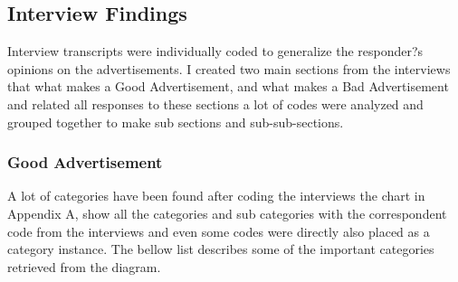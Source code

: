 \subsection{Interview Findings}
Interview transcripts were individually coded to generalize the responder?s opinions on the advertisements. I created two main sections from the interviews that what makes a Good Advertisement, and what makes a Bad Advertisement and related all responses to these sections a lot of codes were analyzed and grouped together to make sub sections and sub-sub-sections.

\subsubsection{Good Advertisement}
A lot of categories have been found after coding the interviews the chart in Appendix A, show all the categories and sub categories with the correspondent code from the interviews and even some codes were directly also placed as a category instance. The bellow list describes some of the important categories retrieved from the diagram.


